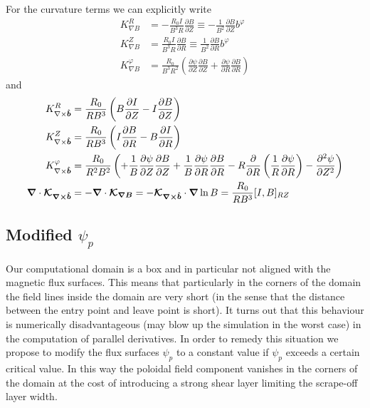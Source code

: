 For the curvature terms we can explicitly write
\begin{align}
K_{\nabla B}^R &= -\frac{R_0 I}{B^3R}\frac{\partial B}{\partial Z} \equiv -\frac{1}{B^2}\frac{\partial B}{\partial Z}b^\varphi \\
K_{\nabla B}^Z &= \frac{R_0 I}{B^3R}\frac{\partial B}{\partial R}\equiv \frac{1}{B^2}\frac{\partial B}{\partial R}b^\varphi \\
K_{\nabla B}^\varphi &= \frac{R_0}{B^3R^2}\left(
      \frac{\partial \psi}{\partial Z} \frac{\partial B}{\partial Z}
    + \frac{\partial \psi}{\partial R}\frac{\partial B}{\partial R}\right)
\label{}
\end{align}
and
\begin{align}
K_{\nabla\times\bm{\hat{b}}}^R &= \frac{R_0 }{RB^3}\left( B\frac{\partial I}{\partial Z} -I\frac{\partial B}{\partial Z}\right) \\
K_{\nabla\times\bm{\hat{b}}}^Z &= \frac{R_0 }{RB^3} \left( I\frac{\partial B}{\partial R} - B\frac{\partial I}{\partial R} \right)\\
K_{\nabla\times\bm{\hat{b}}}^\varphi &= \frac{R_0}{R^2B^2}\left(
+ \frac{1}{B}\frac{\partial\psi}{\partial Z} \frac{\partial B}{\partial Z}
+ \frac{1}{B}\frac{\partial \psi}{\partial R}\frac{\partial B}{\partial R}
-R\frac{\partial}{\partial R}\left(\frac{1}{R}\frac{\partial\psi}{\partial R}\right) 
- \frac{\partial^2 \psi}{\partial Z^2}
\right) \\
{\boldsymbol{\nabla}}\cdot{\boldsymbol{\mathcal K_{\nabla\times\bm{\hat{b}}}}} &= -{\boldsymbol{\nabla}}\cdot{\boldsymbol{\mathcal K_{\nabla B}}}=
    -{\boldsymbol{\mathcal K_{\nabla\times\bm{\hat{b}}}}}\cdot {\boldsymbol{\nabla}}\ln B = \frac{R_0}{RB^3}[I,B]_{RZ}
\label{}
\end{align}

\subsection{ Modified $\psi_p$}
Our computational domain is a box and in particular not aligned with the
magnetic flux surfaces. This means that particularly in the corners of
the domain the field lines inside the domain are very short (in the
sense that the distance between the entry point and leave point is short).
It turns out that this behaviour is numerically disadvantageous (may
blow up the simulation in the worst case) in the
computation of parallel derivatives. In order to remedy this situation
we propose to modify the flux surfaces $\psi_p$ to a constant value
if $\psi_p$ exceeds a certain critical value. In this way the poloidal
field component vanishes in the corners of the domain at the cost
of introducing a strong shear layer limiting the scrape-off layer width.

